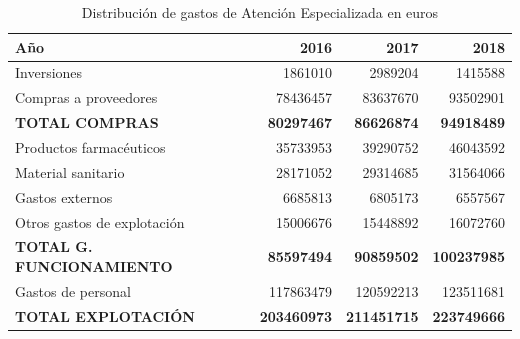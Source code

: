 \begin{table}
    \centering
    \begin{tabular}{lrrr}
        \toprule
        Año                              & 2016               & 2017               & 2018               \\
        \midrule
        Inversiones                      & 1861010            & 2989204            & 1415588            \\
        Compras a proveedores            & 78436457           & 83637670           & 93502901           \\
        \textbf{TOTAL COMPRAS}           & \textbf{80297467}  & \textbf{86626874}  & \textbf{94918489}  \\
        \midrule
        Productos farmacéuticos          & 35733953           & 39290752           & 46043592           \\
        Material sanitario               & 28171052           & 29314685           & 31564066           \\
        Gastos externos                  & 6685813            & 6805173            & 6557567            \\
        Otros gastos de explotación      & 15006676           & 15448892           & 16072760           \\
        \textbf{TOTAL G. FUNCIONAMIENTO} & \textbf{85597494}  & \textbf{90859502}  & \textbf{100237985} \\
        \midrule
        Gastos de personal               & 117863479          & 120592213          & 123511681          \\
        \textbf{TOTAL  EXPLOTACIÓN}      & \textbf{203460973} & \textbf{211451715} & \textbf{223749666} \\
        \bottomrule
    \end{tabular}
    \caption{Distribución de gastos de Atención Especializada en euros}
    \label{tab:gastos-especializada}
\end{table}